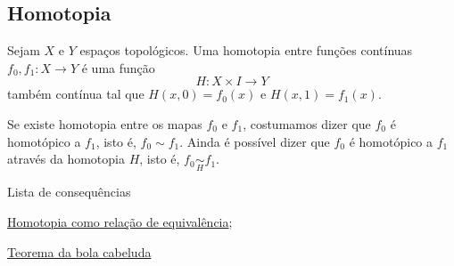 \subsection{Homotopia}
\label{homotopia-def}
\begin{defi}[Homotopia]
	Sejam $X$ e $Y$ espaços topológicos. Uma homotopia entre funções contínuas $f_0, f_1: X\rightarrow Y$ é uma função $$H:X\times I\rightarrow Y$$ também contínua tal que $H(x,0)=f_0(x)$ e $H(x,1)=f_1(x)$.
\end{defi}

Se existe homotopia entre os mapas $f_0$ e $f_1$, costumamos dizer que $f_0$ é homotópico a $f_1$, isto é, $f_0\sim f_1$. Ainda é possível dizer que $f_0$ é homotópico a $f_1$ através da homotopia $H$, isto é, $f_0 \underset{H}{\sim} f_1$.

\begin{titlemize}{Lista de consequências}
	\item \hyperref[homotopia-relaçao-de-equivalencia]{Homotopia como relação de equivalência};\\ %
	\item \hyperref[homotopia-teorema-da-bola-cabeluda]{Teorema da bola cabeluda}
\end{titlemize}

